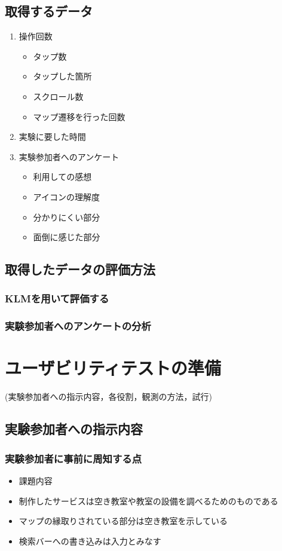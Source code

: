 \documentclass[12pt,a4paper,dvipdf]{jsarticle}
\begin{document}
\subsection{取得するデータ}
\begin{enumerate}
    \item 操作回数
          \begin{itemize}
              \item タップ数
              \item タップした箇所
              \item スクロール数
              \item マップ遷移を行った回数
          \end{itemize}
    \item 実験に要した時間
    \item 実験参加者へのアンケート
          \begin{itemize}
              \item 利用しての感想
              \item アイコンの理解度
              \item 分かりにくい部分
              \item 面倒に感じた部分
          \end{itemize}
\end{enumerate}
\subsection{取得したデータの評価方法}
\subsubsection{KLMを用いて評価する}
\subsubsection{実験参加者へのアンケートの分析}

\section{ユーザビリティテストの準備}
 (実験参加者への指示内容，各役割，観測の方法，試行)
\subsection{実験参加者への指示内容}
\subsubsection{実験参加者に事前に周知する点}
\begin{itemize}
    \item 課題内容
    \item 制作したサービスは空き教室や教室の設備を調べるためのものである
    \item マップの縁取りされている部分は空き教室を示している
    \item 検索バーへの書き込みは入力とみなす
\end{itemize}
\end{document}
